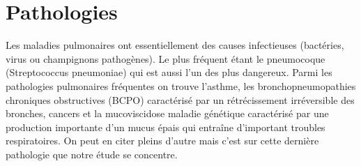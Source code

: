 		\section{Pathologies}
Les maladies pulmonaires ont essentiellement des causes infectieuses (bactéries, virus ou champignons pathogènes). Le plus fréquent étant le pneumocoque (Streptococcus pneumoniae) qui est aussi l’un des plus dangereux. Parmi les pathologies pulmonaires fréquentes on trouve l’asthme, les bronchopneumopathies chroniques obstructives (BCPO) caractérisé par un rétrécissement irréversible des bronches, cancers et la mucoviscidose maladie génétique caractérisé par une production importante d’un mucus épais qui entraîne d’important troubles respiratoires. On peut en citer pleins d’autre mais c’est sur cette dernière pathologie que notre étude se concentre.






